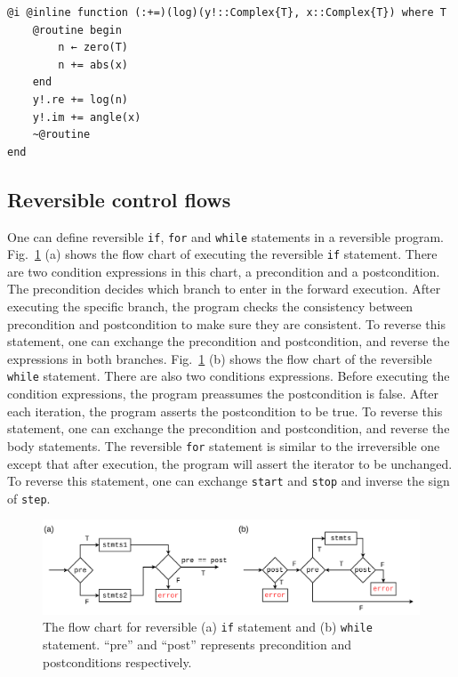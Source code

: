 \documentclass{article}
\newcommand{\<}{\langle}
\renewcommand{\>}{\rangle}
\newcommand{\Fig}[1]{Fig.~\ref{#1}}
\newcommand{\Lst}[1]{Listing.~\ref{#1}}
\theoremstyle{definition}\newtheorem{definition}{\textit{Definition}}
\begin{document}
\begin{minipage}{.88\columnwidth}
    \begin{lstlisting}[mathescape=true,caption={Compute-copy-uncompute version of \Lst{lst:complex}},label={lst:complex2}]
@i @inline function (:+=)(log)(y!::Complex{T}, x::Complex{T}) where T
    @routine begin
        n ← zero(T)
        n += abs(x)
    end
    y!.re += log(n)
    y!.im += angle(x)
    ~@routine
end
\end{lstlisting}
\end{minipage}

\subsection{Reversible control flows}
One can define reversible \texttt{if}, \texttt{for} and \texttt{while} statements in a reversible program.
\Fig{fig:controlflow} (a) shows the flow chart of executing the reversible \texttt{if} statement. There are two condition expressions in this chart, a precondition and a postcondition. The precondition decides which branch to enter in the forward execution. After executing the specific branch, the program checks the consistency between precondition and postcondition to make sure they are consistent. To reverse this statement, one can exchange the precondition and postcondition, and reverse the expressions in both branches.
\Fig{fig:controlflow} (b) shows the flow chart of the reversible \texttt{while} statement. There are also two conditions expressions. Before executing the condition expressions, the program preassumes the postcondition is false.
After each iteration, the program asserts the postcondition to be true. To reverse this statement, one can exchange the precondition and postcondition, and reverse the body statements.
The reversible \texttt{for} statement is similar to the irreversible one except that after execution, the program will assert the iterator to be unchanged. To reverse this statement, one can exchange \texttt{start} and \texttt{stop} and inverse the sign of \texttt{step}.
\begin{figure}
    \centerline{\includegraphics[width=0.9\columnwidth,trim={0 0cm 0 0cm},clip]{controlflow_v2.pdf}}
    \caption{The flow chart for reversible (a) \texttt{if} statement and (b) \texttt{while} statement. ``pre'' and ``post'' represents precondition and postconditions respectively.}\label{fig:controlflow}
\end{figure}
\end{document}
